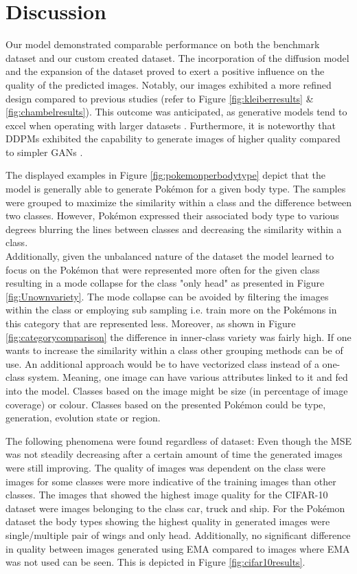\documentclass[12pt]{article}
\theoremstyle{plain}
\theoremstyle{definition}
\theoremstyle{remark}
\begin{document}
\section{Discussion}
\label{sec:discussion}
Our model demonstrated comparable performance on both the benchmark dataset and our custom created dataset. The incorporation of the diffusion model and the expansion of the dataset proved to exert a positive influence on the quality of the predicted images. Notably, our images exhibited a more refined design compared to previous studies (refer to Figure \ref{fig:kleiberresults} \& \ref{fig:chambelresults}). This outcome was anticipated, as generative models tend to excel when operating with larger datasets \citep{Yang2023}. Furthermore, it is noteworthy that \ac{DDPM}s exhibited the capability to generate images of higher quality compared to simpler \ac{GAN}s \citep{Guarnera2023}.

The displayed examples in Figure \ref{fig:pokemonperbodytype} depict that the model is generally able to generate Pokémon for a given body type. The samples  were  grouped to maximize the similarity within a class and the difference between two classes. However, Pokémon expressed their associated body type to various degrees blurring the lines between classes and decreasing the similarity within a class. \\
Additionally, given the unbalanced nature of the dataset the model learned to focus on the Pokémon that  were  represented more often for the given class resulting in a mode collapse for the class "only head" as presented in Figure \ref{fig:Unownvariety}. The mode collapse can be avoided by filtering the images within the class or employing sub sampling i.e. train more on the Pokémons in this category that are represented less. 
Moreover, as shown in Figure \ref{fig:categorycomparison} the difference in inner-class variety was fairly high. If one wants to increase the similarity within a class other grouping methods can be of use. An additional approach would be to have vectorized class instead of a one-class system. Meaning, one image can have various attributes linked to it and fed into the model. Classes based on the image might be size (in percentage of image coverage) or colour. Classes based on the presented Pokémon could be type, generation, evolution state or region. 

The following phenomena  were  found regardless of dataset: Even though the \ac{MSE} was not steadily decreasing after a certain amount of time the generated images  were  still improving. The quality of images was dependent on the class  were  images for some classes  were  more indicative of the training images than other classes. The images that showed the highest image quality for the \ac{CIFAR-10} dataset  were  images belonging to the class car, truck and ship. For the Pokémon dataset the body types showing the highest quality in generated images  were  single/multiple pair of wings and only head. Additionally, no significant difference in quality between images generated using \ac{EMA} compared to images where \ac{EMA} was not used can be seen. This is depicted in Figure \ref{fig:cifar10results}.
\end{document}
